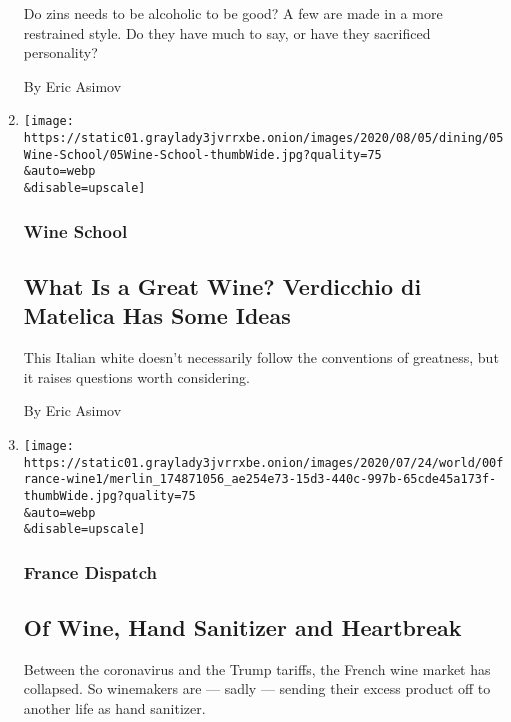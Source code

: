 \begin{enumerate}
  Do zins needs to be alcoholic to be good? A few are made in a more
  restrained style. Do they have much to say, or have they sacrificed
  personality?

  By Eric Asimov
\item
  \href{/2020/07/30/dining/drinks/wine-school-verdicchio-di-matelica.html}{}

  \texttt{[image: https://static01.graylady3jvrrxbe.onion/images/2020/08/05/dining/05Wine-School/05Wine-School-thumbWide.jpg?quality=75\\\&auto=webp\\\&disable=upscale]}

  \hypertarget{wine-school-3}{%
  \subsubsection{Wine School}\label{wine-school-3}}

  \hypertarget{what-is-a-great-wine-verdicchio-di-matelica-has-some-ideas}{%
  \subsection{What Is a Great Wine? Verdicchio di Matelica Has Some
  Ideas}\label{what-is-a-great-wine-verdicchio-di-matelica-has-some-ideas}}

  This Italian white doesn't necessarily follow the conventions of
  greatness, but it raises questions worth considering.

  By Eric Asimov
\item
  \href{/2020/07/27/world/europe/france-alsace-wine-coronavirus.html}{}

  \texttt{[image: https://static01.graylady3jvrrxbe.onion/images/2020/07/24/world/00france-wine1/merlin\_174871056\_ae254e73-15d3-440c-997b-65cde45a173f-thumbWide.jpg?quality=75\\\&auto=webp\\\&disable=upscale]}

  \hypertarget{france-dispatch}{%
  \subsubsection{France Dispatch}\label{france-dispatch}}

  \hypertarget{of-wine-hand-sanitizer-and-heartbreak}{%
  \subsection{Of Wine, Hand Sanitizer and
  Heartbreak}\label{of-wine-hand-sanitizer-and-heartbreak}}

  Between the coronavirus and the Trump tariffs, the French wine market
  has collapsed. So winemakers are --- sadly --- sending their excess
  product off to another life as hand sanitizer.


\end{enumerate}
